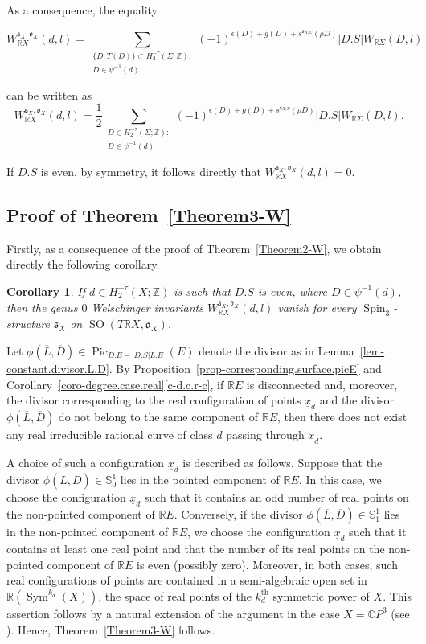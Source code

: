 \documentclass[11pt]{amsart}
\numberwithin{equation}{section}
\theoremstyle{definition}
\theoremstyle{plain}
\newtheorem{corollary}[definition]{Corollary}
\theoremstyle{remark}
\newcommand{\R}{\mathbb{R}}
\newcommand{\Z}{\mathbb{Z}}
\newcommand{\C}{\mathbb{C}}
\DeclareMathOperator{\Pic}{Pic}
\DeclareMathOperator{\SO}{SO}
\DeclareMathOperator{\Spin}{Spin}
\newcommand{\Sym}{\operatorname{Sym}}
\newcommand{\supth}[1]{\ensuremath{#1^{\mathrm{th}}}}
\begin{document}
As a consequence, the equality

$$ 
  W_{\R X}^{\mathfrak{s}_X,\mathfrak{o}_X}(d,l)=\sum_{\substack{\{D,T(D)\}\subset H_2^{-\tau}(\Sigma;\Z):\\D\in \psi^{-1}(d)}
      }(-1)^{\epsilon(D)+g(D)+s^{\mathfrak{s}_{X|\Sigma}}(\rho D)} |D.S| W_{\R \Sigma}(D,l)$$
     
     can be written as 
$$W_{\R X}^{\mathfrak{s}_X,\mathfrak{o}_X}(d,l)=\frac{1}{2}\sum_{\substack{D\in H_2^{-\tau}(\Sigma;\Z):\\
          D\in \psi^{-1}(d)}}(-1)^{\epsilon(D)+g(D)+s^{\mathfrak{s}_{X|\Sigma}}(\rho D)} |D.S| W_{\R \Sigma}(D,l).$$

If $D.S$ is even, by symmetry, it follows directly that $W_{\R X}^{\mathfrak{s}_X,\mathfrak{o}_X}(d,l)=0$.

\subsection{Proof of Theorem~\ref{Theorem3-W}}
Firstly, as a consequence of the proof of Theorem~\ref{Theorem2-W}, we obtain directly the following corollary.

\begin{corollary} \label{coro-Theorem2-W}
If $d\in H_2^{-\tau}(X;\Z)$ is such that $D.S$ is even, where $D\in \psi^{-1}(d)$, then  the genus $0$ Welschinger invariants  $W_{\R X}^{\mathfrak{s}_X,\mathfrak{o}_X}(d,l)$ vanish for every $\Spin_3$-structure $\mathfrak{s}_X$ on $\SO(T \R X,\mathfrak{o}_X)$. 
\end{corollary}

Let $\phi(\overline{L},\overline{D})\in \Pic_{D.E-|D.S|L.E}(E)$ denote the divisor as in Lemma~\ref{lem-constant.divisor.L.D}. By Proposition~\ref{prop-corresponding.surface.picE} and Corollary~\ref{coro-degree.case.real}\eqref{c-d.c.r-c}, if $\R E$ is disconnected and, moreover, the divisor corresponding to the real configuration of points $\underline{x}_d$ and the divisor $\phi(\overline{L},\overline{D})$ do not belong to the same component of $\R E$, then there does not exist any real irreducible rational curve of class $d$ passing through $\underline{x}_d$.

A choice of such a configuration $\underline{x}_d$ is described as follows. 
Suppose that the divisor $\phi(\overline{L},\overline{D})\in \mathbb{S}^1_0$ lies in the pointed component of $\R E$. In this case, we choose the configuration $\underline{x}_d$ such that it contains an odd number of real points on the non-pointed component of $\R E$. 
Conversely, if the divisor $\phi(\overline{L},\overline{D})\in \mathbb{S}^1_1$ lies in the non-pointed component of $\R E$, we choose the configuration $\underline{x}_d$ such that it contains at least one real point and that the number of its real points on the non-pointed component of $\mathbb{R} E$ is even (possibly zero). Moreover, in both cases, such real configurations of points are contained in a semi-algebraic open set in $\R (\Sym^{k_d}(X))$, the space of real points of the $\supth{k_d}$ symmetric power of $X$. This assertion follows by a natural extension of the argument in the case $X=\C P^3$ (see \cite[Theorem 10]{kollar2015examples}). Hence, Theorem~\ref{Theorem3-W} follows.
\end{document}
